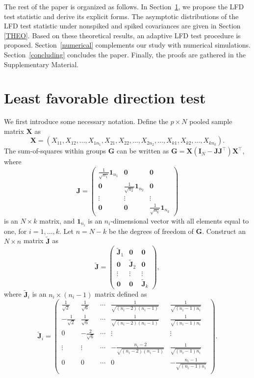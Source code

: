 \documentclass[12pt]{article} %
\newcommand{\bX}{\mathbf{X}}
\newcommand{\bG}{\mathbf{G}}
\newcommand{\bJ}{\mathbf{J}}
\newcommand{\bI}{\mathbf{I}}
\theoremstyle{definition}
\begin{document}
    The rest of the paper is organized  as follows.
    In Section~\ref{methodology}, we propose the LFD test statistic and derive its explicit forms.
    The asymptotic distributions of the LFD test statistic under nonspiked and spiked covariances are given in Section \ref{THEO}.
    Based on these theoretical results, an adaptive LFD test procedure is proposed.
     Section~\ref{numerical} complements our study with numerical simulations.
     Section~\ref{concluding} concludes the paper.
     Finally, the proofs are gathered in the Supplementary Material.





 
\section{Least favorable direction test}\label{methodology}
\setcounter{equation}{0} %
We first introduce some necessary notation.
 Define the $p\times N$ pooled sample matrix $\bX$ as
 $$\bX=(X_{11},X_{12},\ldots,X_{1n_1},X_{21},X_{22},\ldots,X_{2n_2},\ldots,X_{k1},X_{k2},\ldots,X_{kn_k}).$$
 The sum-of-squares within groups $\bG$ can be written as $\bG=\bX(\bI_N-\bJ\bJ^\top)\bX^\top$, where
 $$
 \bJ=\begin{pmatrix}
     \frac{1}{\sqrt{n_1}}\mathbf{1}_{n_1}&\mathbf{0} & \mathbf{0}\\
     \mathbf{0}&\frac{1}{\sqrt{n_2}} \mathbf{1}_{n_2}& \mathbf{0}\\
     \vdots &\vdots &\vdots \\
     \mathbf{0}&\mathbf{0}&\frac{1}{\sqrt{n_k}}\mathbf{1}_{n_k}
 \end{pmatrix}
 $$
 is an $N\times k$ matrix,
 and $\mathbf{1}_{n_i}$ is an $n_i$-dimensional vector with all elements equal to one, for $i=1,\ldots, k$.
 Let $n=N-k$ be the degrees of freedom of $\bG$.
 Construct an $N\times n$ matrix $\tilde{\bJ}$ as 
 $$
 \tilde{\bJ}=\begin{pmatrix}
     \tilde{\bJ}_1&\mathbf{0} & \mathbf{0}\\
     \mathbf{0}&\tilde{\bJ}_2& \mathbf{0}\\
     \vdots &\vdots &\vdots \\
     \mathbf{0}&\mathbf{0}&\tilde{\bJ}_k
 \end{pmatrix},
 $$
 where $\tilde{\bJ}_i$ is an $n_i\times (n_{i}-1)$ matrix defined as
 $$
\tilde{\bJ}_i=\begin{pmatrix}
    \frac{1}{\sqrt{2}}&\frac{1}{\sqrt{6}}&\cdots&\frac{1}{\sqrt{(n_i-2)(n_i-1)}}&\frac{1}{\sqrt{(n_i-1)n_i}}\\
    -\frac{1}{\sqrt{2}}&\frac{1}{\sqrt{6}}&\cdots&\frac{1}{\sqrt{(n_i-2)(n_i-1)}}&\frac{1}{\sqrt{(n_i-1)n_i}}\\
    0&-\frac{2}{\sqrt{6}}&\cdots&\vdots&\vdots\\
    \vdots&\vdots&\cdots&-\frac{n_i-2}{\sqrt{(n_i-2)(n_i-1)}}&\frac{1}{\sqrt{(n_i-1)n_i}}\\
    0&0&\cdots&0&-\frac{n_i-1}{\sqrt{(n_i-1)n_i}}\\
\end{pmatrix}.
 $$
\end{document}
